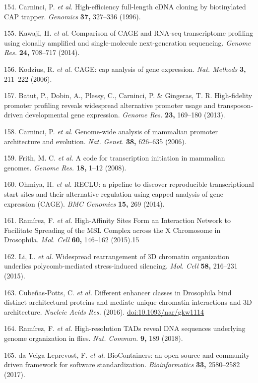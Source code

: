 \documentclass[11pt,twoside]{MPIthesis}
\theoremstyle{definition}
\theoremstyle{definition}
\theoremstyle{definition}
\theoremstyle{remark}
\begin{document}
154. Carninci, P. \emph{et al.} High-efficiency full-length cDNA cloning
by biotinylated CAP trapper. \emph{Genomics} \textbf{37,} 327--336
(1996).

155. Kawaji, H. \emph{et al.} Comparison of CAGE and RNA-seq
transcriptome profiling using clonally amplified and single-molecule
next-generation sequencing. \emph{Genome Res.} \textbf{24,} 708--717
(2014).

156. Kodzius, R. \emph{et al.} CAGE: cap analysis of gene expression.
\emph{Nat. Methods} \textbf{3,} 211--222 (2006).

157. Batut, P., Dobin, A., Plessy, C., Carninci, P. \& Gingeras, T. R.
High-fidelity promoter profiling reveals widespread alternative promoter
usage and transposon-driven developmental gene expression. \emph{Genome
Res.} \textbf{23,} 169--180 (2013).

158. Carninci, P. \emph{et al.} Genome-wide analysis of mammalian
promoter architecture and evolution. \emph{Nat. Genet.} \textbf{38,}
626--635 (2006).

159. Frith, M. C. \emph{et al.} A code for transcription initiation in
mammalian genomes. \emph{Genome Res.} \textbf{18,} 1--12 (2008).

160. Ohmiya, H. \emph{et al.} RECLU: a pipeline to discover reproducible
transcriptional start sites and their alternative regulation using
capped analysis of gene expression (CAGE). \emph{BMC Genomics}
\textbf{15,} 269 (2014).

161. Ramírez, F. \emph{et al.} High-Affinity Sites Form an Interaction
Network to Facilitate Spreading of the MSL Complex across the X
Chromosome in Drosophila. \emph{Mol. Cell} \textbf{60,} 146--162
(2015).15

162. Li, L. \emph{et al.} Widespread rearrangement of 3D chromatin
organization underlies polycomb-mediated stress-induced silencing.
\emph{Mol. Cell} \textbf{58,} 216--231 (2015).

163. Cubeñas-Potts, C. \emph{et al.} Different enhancer classes in
Drosophila bind distinct architectural proteins and mediate unique
chromatin interactions and 3D architecture. \emph{Nucleic Acids Res.}
(2016). \url{doi:10.1093/nar/gkw1114}

164. Ramírez, F. \emph{et al.} High-resolution TADs reveal DNA sequences
underlying genome organization in flies. \emph{Nat. Commun.} \textbf{9,}
189 (2018).

165. da Veiga Leprevost, F. \emph{et al.} BioContainers: an open-source
and community-driven framework for software standardization.
\emph{Bioinformatics} \textbf{33,} 2580--2582 (2017).
\end{document}
